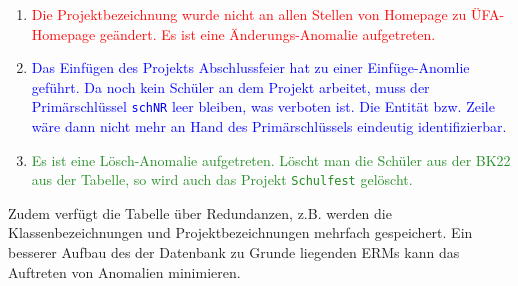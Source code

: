 \begin{enumerate}
	\item \textcolor{red}{Die Projektbezeichnung wurde nicht an allen Stellen von Homepage zu ÜFA-Homepage geändert. Es ist eine Änderungs-Anomalie aufgetreten.}
	\item \textcolor{blue}{Das Einfügen des Projekts Abschlussfeier hat zu einer Einfüge-Anomlie geführt. Da noch kein Schüler an dem Projekt arbeitet, muss der Primärschlüssel \lstinline!schNR! leer bleiben, was verboten ist. Die Entität bzw. Zeile wäre dann nicht mehr an Hand des Primärschlüssels eindeutig identifizierbar.}
	\item \textcolor{ForestGreen}{Es ist eine Lösch-Anomalie aufgetreten. Löscht man die Schüler aus der BK22 aus der Tabelle, so wird auch das Projekt \texttt{Schulfest} gelöscht.}
\end{enumerate}
Zudem verfügt die Tabelle über Redundanzen, z.B. werden die Klassenbezeichnungen und Projektbezeichnungen mehrfach gespeichert. Ein besserer Aufbau des der Datenbank zu Grunde liegenden ERMs kann das Auftreten von Anomalien minimieren.